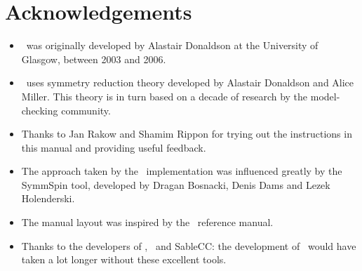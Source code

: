 \chapter*{Acknowledgements}

\begin{itemize}

\item \topspin\ was originally developed by Alastair Donaldson at the University of Glasgow, between 2003 and 2006.

\item \topspin\ uses symmetry reduction theory developed by Alastair Donaldson and Alice Miller.  This theory is
in turn based on a decade of research by the model-checking
community.

\item Thanks to Jan Rakow and Shamim Rippon for trying out the instructions in this manual and
providing useful feedback.

\item The approach taken by the \topspin\ implementation was influenced greatly by the SymmSpin tool, developed
by Dragan Bosnacki, Denis Dams and Lezek Holenderski.

\item The manual layout was inspired by the \gap\ reference manual.

\item Thanks to the developers of \gap, \saucy\ and SableCC: the development of \topspin\ would have taken a lot
longer without these excellent tools.

\end{itemize}
